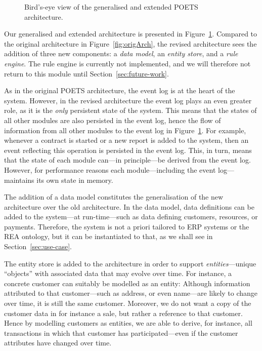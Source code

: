 \begin{figure}
  \centering\small
  
  \caption{Bird's-eye view of the generalised and extended POETS
    architecture.}
  \label{fig:arch}
\end{figure}

Our generalised and extended architecture is presented in
Figure~\ref{fig:arch}. Compared to the original architecture in
Figure~\ref{fig:origArch}, the revised architecture sees the addition
of three new components: a \emph{data model}, an \emph{entity store},
and a \emph{rule engine}. The rule engine is currently not
implemented, and we will therefore not return to this module until
Section~\ref{sec:future-work}.

As in the original POETS architecture, the event log is at the heart
of the system. However, in the revised architecture the event log
plays an even greater role, as it is the \emph{only} persistent state
of the system. This means that the states of all other modules are
also persisted in the event log, hence the flow of information from
all other modules to the event log in Figure~\ref{fig:arch}. For
example, whenever a contract is started or a new report is added to
the system, then an event reflecting this operation is persisted in the
event log. This, in turn, means that the state of each module can---in
principle---be derived from the event log. However, for performance
reasons each module---including the event log---maintains its own
state in memory.

The addition of a data model constitutes the generalisation of the new
architecture over the old architecture. In the data model, data
definitions can be added to the system---at run-time---such as data
defining customers, resources, or payments. Therefore, the system
is not a priori tailored to ERP systems or the REA ontology,
but it can be instantiated to that, as we shall see in
Section~\ref{sec:use-case}.

The entity store is added to the architecture in order to support
\emph{entities}---unique ``objects'' with associated data that may
evolve over time. For instance, a concrete customer can suitably be
modelled as an entity: Although information attributed to that
customer---such as address, or even name---are likely to change over
time, it is still the same customer. Moreover, we do not want a copy
of the customer data in for instance a sale, but rather a reference to
that customer. Hence by modelling customers as entities, we are able
to derive, for instance, all transactions in which that customer has
participated---even if the customer attributes have changed over time.

